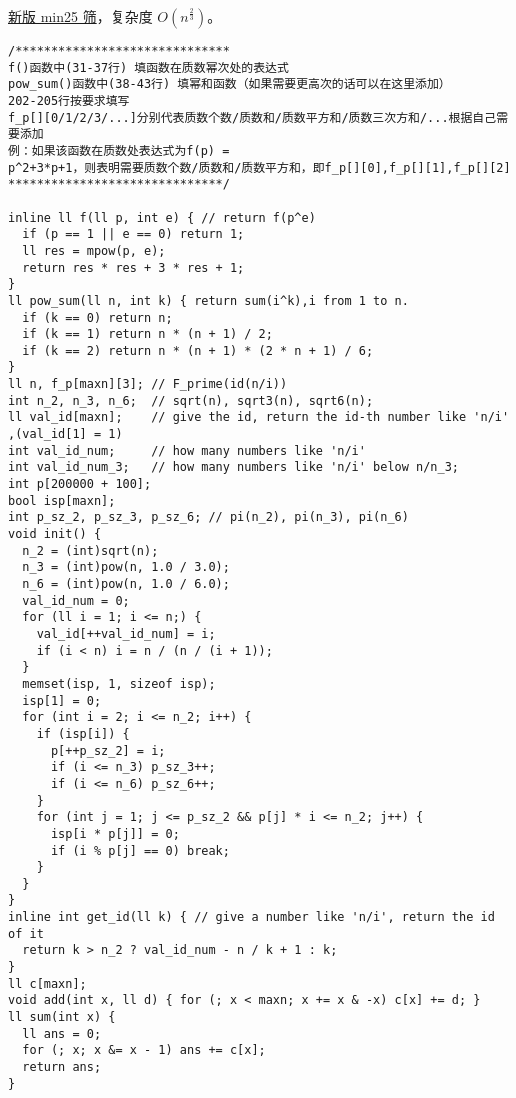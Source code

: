 \href{https://zhuanlan.zhihu.com/p/60378354}{新版 min25 筛}，复杂度 $O\left(n^{\frac{2}{3}}\right)$。
\begin{lstlisting}
/******************************
f()函数中(31-37行) 填函数在质数幂次处的表达式
pow_sum()函数中(38-43行) 填幂和函数（如果需要更高次的话可以在这里添加）
202-205行按要求填写
f_p[][0/1/2/3/...]分别代表质数个数/质数和/质数平方和/质数三次方和/...根据自己需要添加
例：如果该函数在质数处表达式为f(p) =
p^2+3*p+1，则表明需要质数个数/质数和/质数平方和，即f_p[][0],f_p[][1],f_p[][2]
******************************/

inline ll f(ll p, int e) { // return f(p^e)
  if (p == 1 || e == 0) return 1;
  ll res = mpow(p, e);
  return res * res + 3 * res + 1;
}
ll pow_sum(ll n, int k) { return sum(i^k),i from 1 to n.
  if (k == 0) return n;
  if (k == 1) return n * (n + 1) / 2;
  if (k == 2) return n * (n + 1) * (2 * n + 1) / 6;
}
ll n, f_p[maxn][3]; // F_prime(id(n/i))
int n_2, n_3, n_6;  // sqrt(n), sqrt3(n), sqrt6(n);
ll val_id[maxn];    // give the id, return the id-th number like 'n/i' ,(val_id[1] = 1)
int val_id_num;     // how many numbers like 'n/i'
int val_id_num_3;   // how many numbers like 'n/i' below n/n_3;
int p[200000 + 100];
bool isp[maxn];
int p_sz_2, p_sz_3, p_sz_6; // pi(n_2), pi(n_3), pi(n_6)
void init() {
  n_2 = (int)sqrt(n);
  n_3 = (int)pow(n, 1.0 / 3.0);
  n_6 = (int)pow(n, 1.0 / 6.0);
  val_id_num = 0;
  for (ll i = 1; i <= n;) {
    val_id[++val_id_num] = i;
    if (i < n) i = n / (n / (i + 1));
  }
  memset(isp, 1, sizeof isp);
  isp[1] = 0;
  for (int i = 2; i <= n_2; i++) {
    if (isp[i]) {
      p[++p_sz_2] = i;
      if (i <= n_3) p_sz_3++;
      if (i <= n_6) p_sz_6++;
    }
    for (int j = 1; j <= p_sz_2 && p[j] * i <= n_2; j++) {
      isp[i * p[j]] = 0;
      if (i % p[j] == 0) break;
    }
  }
}
inline int get_id(ll k) { // give a number like 'n/i', return the id of it
  return k > n_2 ? val_id_num - n / k + 1 : k;
}
ll c[maxn];
void add(int x, ll d) { for (; x < maxn; x += x & -x) c[x] += d; }
ll sum(int x) {
  ll ans = 0;
  for (; x; x &= x - 1) ans += c[x];
  return ans;
}


\end{lstlisting}
